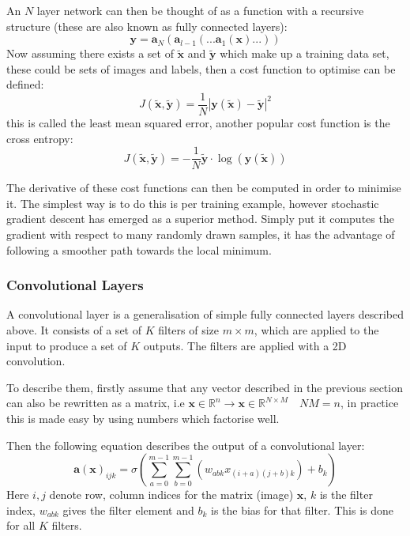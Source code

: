 \documentclass[9pt]{article} \usepackage{amsmath, amsthm, amssymb}
\begin{document}
An $N$ layer network can
then be thought of as a function with a recursive structure (these are also known as fully connected layers):
\begin{equation}
    \mathbf{y} = \mathbf{a}_{N}(\mathbf{a}_{l-1}(...\mathbf{a}_1(\mathbf{x})...))
\end{equation}
Now assuming there exists a set of $\tilde{\mathbf{x}}$ and $\tilde{\mathbf{y}}$ which make
up a training data set, these could be sets of images and labels, then a cost function
to optimise can be defined:
\begin{equation}
    J(\tilde{\mathbf{x}},\tilde{\mathbf{y}}) = \frac{1}{N}\left |\mathbf{y}(\tilde{\mathbf{x}})-\tilde{\mathbf{y}}\right | ^2
\end{equation}
this is called the least mean squared error, another popular cost function is
the cross entropy:
\begin{equation}
    J(\tilde{\mathbf{x}},\tilde{\mathbf{y}}) = -\frac{1}{N}\tilde{\mathbf{y}}\cdot\log(\mathbf{y}(\tilde{\mathbf{x}}))
\end{equation}

The derivative of these cost functions can then be computed in order to minimise it.
The simplest way is to do this is per training example, however stochastic gradient
descent\cite{Amari1993} has emerged as a superior method. Simply put it computes the gradient with respect
to many randomly drawn samples, it has the advantage of following a smoother path
towards the local minimum.
\subsubsection*{Convolutional Layers}
A convolutional layer is a generalisation of simple fully connected layers described
above. It consists of a set of $K$ filters of size $m\times m$, which are applied to the input to produce
a set of $K$ outputs. The filters are applied with a 2D convolution.


To describe them, firstly assume that any vector described in the previous section
can also be rewritten as a matrix, i.e $\mathbf{x} \in \mathbb{R}^{n}
\rightarrow \mathbf{x} \in \mathbb{R}^{N \times M} \quad NM=n$, in practice this is made
easy by using numbers which factorise well.

Then the following equation describes the output of a convolutional layer:
\begin{equation} \label{CNN}
    \mathbf{a}(\mathbf{x})_{ijk} = \sigma \left ( \sum_{a=0}^{m-1}\sum_{b=0}^{m-1}(w_{abk}x_{(i+a)(j+b)k}) + b_k \right )
\end{equation}
Here $i,j$  denote row, column indices for the matrix (image) $\mathbf{x}$, $k$ is the filter index, $w_{abk}$
gives the filter element and $b_k$ is the bias for that filter. This is done for all $K$ filters.
\end{document}
